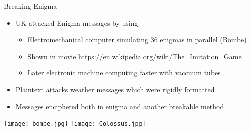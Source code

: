 \begin{withoutheadline}
\begin{frame}{Breaking Enigma}
\begin{itemize} 
    \item UK attacked Enigma messages by using
    \begin{itemize}
        \item Electromechanical computer simulating 36 enigmas in parallel (Bombe)
        \item Shown in movie \url{https://en.wikipedia.org/wiki/The_Imitation_Game}
        \item Later electronic machine computing faster with vaccuum tubes
    \end{itemize}
    \item Plaintext attacks weather messages which were rigidly formatted
    \item Messages enciphered both in enigma and another breakable method
\end{itemize}
\texttt{[image: bombe.jpg]}
\texttt{[image: Colossus.jpg]}
\end{frame}

\end{withoutheadline}

 
